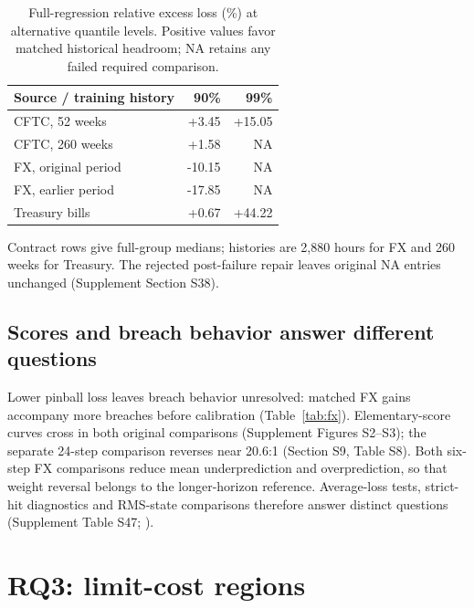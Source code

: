 \documentclass[11pt,a4paper]{article}
\begin{document}
\begin{table}[htbp]\centering\small
\caption{Full-regression relative excess loss (\%) at alternative quantile levels. Positive values favor matched historical headroom; NA retains any failed required comparison.}\label{tab:v12-tau}
\begin{tabular}{lrr}\toprule
Source / training history & 90\% & 99\% \\\midrule
CFTC, 52 weeks & +3.45 & +15.05 \\
CFTC, 260 weeks & +1.58 & \textsc{NA} \\
FX, original period & -10.15 & \textsc{NA} \\
FX, earlier period & -17.85 & \textsc{NA} \\
Treasury bills & +0.67 & +44.22 \\
\bottomrule\end{tabular}
\par\vspace{2pt}\begin{minipage}{.95\linewidth}\footnotesize
Contract rows give full-group medians; histories are 2,880 hours for FX and 260 weeks for Treasury.
The rejected post-failure repair leaves original NA entries unchanged (Supplement Section S38).
\end{minipage}\end{table}


\subsection{Scores and breach behavior answer different questions}

Lower pinball loss leaves breach behavior unresolved: matched FX gains accompany more breaches before calibration (Table~\ref{tab:fx}). Elementary-score curves cross in both original comparisons (Supplement Figures S2--S3); the separate 24-step comparison reverses near 20.6:1 (Section S9, Table S8). Both six-step FX comparisons reduce mean underprediction and overprediction, so that weight reversal belongs to the longer-horizon reference. Average-loss tests, strict-hit diagnostics and RMS-state comparisons therefore answer distinct questions (Supplement Table S47; \citealp{gw2006}).

\FloatBarrier

\section{RQ3: limit-cost regions}\label{sec:cost}
\end{document}
